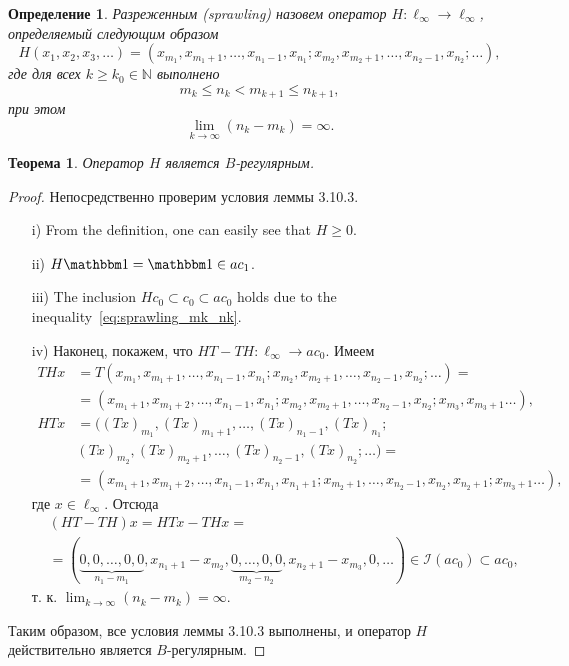 \documentclass[a4paper,14pt]{article} %
\newcommand{\one}{\ensuremath{\mathbbm 1}}
\theoremstyle{plain}
\newtheorem{theorem}[lemma]{Теорема}
\newtheorem{definition}[lemma]{Определение}
\begin{document}
	\begin{definition}
		Разреженным (sprawling) назовем оператор $H: \ell_\infty \to \ell_\infty$,
		определяемый следующим образом
		$$
		H(x_1, x_2, x_3, \ldots) = (x_{m_1}, x_{m_1 + 1}, \ldots, x_{n_1 - 1}, x_{n_1};
		x_{m_2}, x_{m_2 + 1}, \ldots, x_{n_2 - 1}, x_{n_2}; \ldots),
		$$
		где для всех
		$k \geqslant k_0 \in \mathbb N$
		выполнено
		\begin{equation}
			\label{eq:sprawling_mk_nk}
			m_k \leqslant n_k < m_{k+1}\leqslant n_{k+1},
		\end{equation}
		при этом
		$$
			\lim\limits_{k \to \infty} (n_k - m_k) = \infty.
		$$
	\end{definition}



	\begin{theorem}
		Оператор $H$ является $B$-регулярным.
	\end{theorem}

	\begin{proof}
		Непосредственно проверим условия леммы 3.10.3.
		\begin{enumerate}
			\item[i)] From the definition, one can easily see that $H\geq 0$.
			\item[ii)] $H \one = \one \in ac_1$.
			\item[iii)] The inclusion $Hc_0 \subset c_0 \subset ac_0$ holds due to the inequality~\eqref{eq:sprawling_mk_nk}.
			\item[iv)] Наконец, покажем, что $HT - TH : \ell_\infty \to ac_0$. Имеем
			\begin{align*}
				THx &= T(x_{m_1}, x_{m_1 + 1}, \ldots, x_{n_1 - 1}, x_{n_1};
				x_{m_2}, x_{m_2 + 1}, \ldots, x_{n_2 - 1}, x_{n_2}; \ldots) = \\
				&= (x_{m_1 + 1}, x_{m_1 + 2}, \ldots, x_{n_1 - 1}, x_{n_1};
				x_{m_2}, x_{m_2 + 1}, \ldots, x_{n_2 - 1}, x_{n_2}; x_{m_3}, x_{m_3 + 1}\ldots), \\
				HTx &= ((Tx)_{m_1}, (Tx)_{m_1 + 1}, \ldots, (Tx)_{n_1 - 1}, (Tx)_{n_1}; \\
				&(Tx)_{m_2}, (Tx)_{m_2 + 1}, \ldots, (Tx)_{n_2 - 1}, (Tx)_{n_2}; \ldots) = \\
				&= (x_{m_1 + 1}, x_{m_1 + 2}, \ldots, x_{n_1 - 1}, x_{n_1}, x_{n_1 + 1}; x_{m_2 + 1},
				\ldots, x_{n_2 - 1}, x_{n_2}, x_{n_2 + 1}; x_{m_3 + 1} \ldots),
			\end{align*}
			где $x \in \ell_\infty$. Отсюда
			\begin{align*}
				&(HT - TH)x = HTx - THx = \\
				&= (\underbrace{0, 0, \ldots, 0, 0}_{n_1 - m_1}, x_{n_1 + 1} - x_{m_2}, \underbrace{0, \ldots,
					0, 0}_{m_2 - n_2}, x_{n_2 + 1} - x_{m_3}, 0, \ldots) \in \mathcal I(ac_0) \subset ac_0,
			\end{align*}
			т. к. $\lim_{k \to \infty} (n_k - m_k) = \infty$.
		\end{enumerate}

		Таким образом, все условия леммы 3.10.3 выполнены, и оператор $H$ действительно является $B$-регулярным.
	\end{proof}
\end{document}
